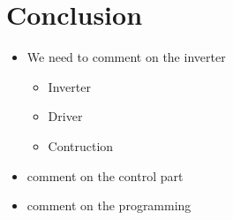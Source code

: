 \section{Conclusion}

\begin{itemize}
    \item We need to comment on the inverter
        \begin{itemize}
            \item Inverter
            \item Driver
            \item Contruction
        \end{itemize}
    \item comment on the control part
        
    \item comment on the programming
\end{itemize}